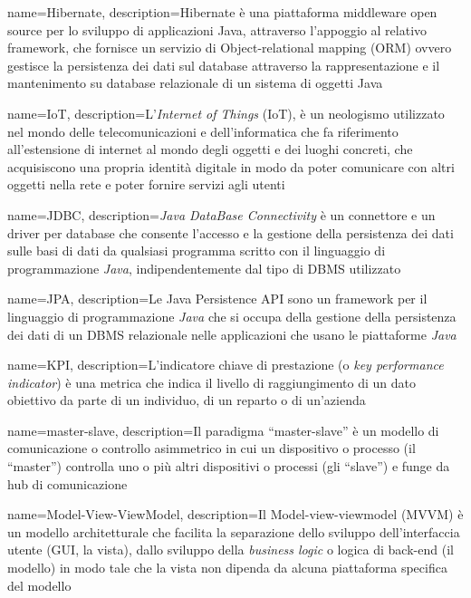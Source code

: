 {
    name=Hibernate,
    description={Hibernate è una piattaforma middleware open source per lo sviluppo di applicazioni Java, attraverso l'appoggio al relativo framework, che fornisce un servizio di Object-relational mapping (ORM) ovvero gestisce la persistenza dei dati sul database attraverso la rappresentazione e il mantenimento su database relazionale di un sistema di oggetti Java \cite{site:wiki}}
}

{
    name=IoT,
    description={L'\textit{Internet of Things} (IoT), è un neologismo utilizzato nel mondo delle telecomunicazioni e dell'informatica che fa riferimento all'estensione di internet al mondo degli oggetti e dei luoghi concreti, che acquisiscono una propria identità digitale in modo da poter comunicare con altri oggetti nella rete e poter fornire servizi agli utenti \cite{site:wiki}}
}

{
    name=JDBC,
    description={\textit{Java DataBase Connectivity} è un connettore e un driver per database che consente l'accesso e la gestione della persistenza dei dati sulle basi di dati da qualsiasi programma scritto con il linguaggio di programmazione \textit{Java}, indipendentemente dal tipo di DBMS utilizzato \cite{site:wiki}}
}

{
    name=JPA,
    description={Le Java Persistence API sono un framework per il linguaggio di programmazione \textit{Java} che si occupa della gestione della persistenza dei dati di un DBMS relazionale nelle applicazioni che usano le piattaforme \textit{Java} \cite{site:wiki}}
}

{
    name=KPI,
    description={L’indicatore chiave di prestazione (o \textit{key performance indicator}) è una metrica che indica il livello di raggiungimento di un dato obiettivo da parte di un individuo, di un reparto o di un’azienda \cite{site:wiki}}
}

{
    name=master-slave,
    description={Il paradigma ``master-slave'' è un modello di comunicazione o controllo asimmetrico in cui un dispositivo o processo (il ``master'') controlla uno o più altri dispositivi o processi (gli ``slave'') e funge da hub di comunicazione \cite{site:wiki}}
}

{
    name=Model-View-ViewModel,
    description={Il Model-view-viewmodel (MVVM) è un modello architetturale che facilita la separazione dello sviluppo dell'interfaccia utente (GUI, la vista), dallo sviluppo della \textit{business logic} o logica di back-end (il modello) in modo tale che la vista non dipenda da alcuna piattaforma specifica del modello \cite{site:wiki}}
}

